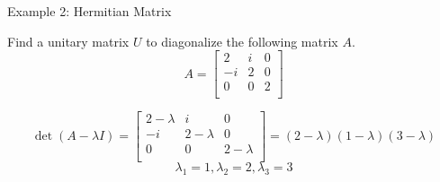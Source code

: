 \documentclass{beamer}
\begin{document}
\begin{frame}{Example 2: Hermitian Matrix}
    \begin{example}
        Find a unitary matrix $U$ to diagonalize the following matrix $A$.
        \begin{equation*}
            A=\left[ \begin{matrix}
                2&		i&		0\\
                -i&		2&		0\\
                0&		0&		2\\
            \end{matrix} \right]
        \end{equation*}
    \end{example}
\begin{equation*}
    \det \left( A-\lambda I \right) =\left[ \begin{matrix}
        2-\lambda&		i&		0\\
        -i&		2-\lambda&		0\\
        0&		0&		2-\lambda\\
    \end{matrix} \right] =\left( 2-\lambda \right) \left( 1-\lambda \right) \left( 3-\lambda \right)
\end{equation*}
\begin{equation*}
    \lambda_1=1, \lambda_2=2, \lambda_3=3
\end{equation*}
\end{frame}
\end{document}
